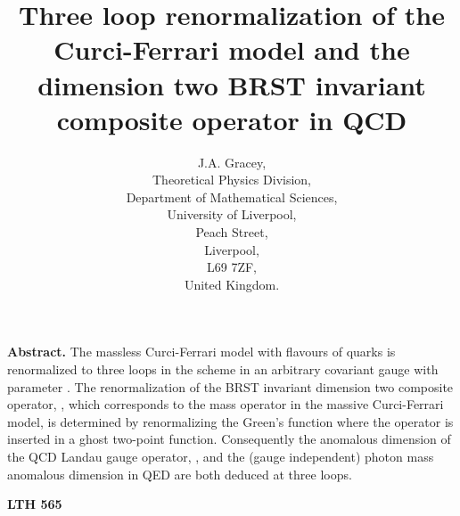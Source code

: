 \documentclass[a4paper,11pt]{article}
\providecommand{\half}{\mbox{\small{\myHighlight{$\frac{1}{2}$}\coordHE{}}}}
\providecommand{\Nf}{N_{\!f}}
\providecommand{\MSbar}{\overline{\mbox{MS}}}
\begin{document}
\title{Three loop \myHighlight{$\MSbar$}\coordHE{} renormalization of the Curci-Ferrari model and the 
dimension two BRST invariant composite operator in QCD} 
\author{J.A. Gracey, \\ Theoretical Physics Division, \\ 
Department of Mathematical Sciences, \\ University of Liverpool, \\ Peach 
Street, \\ Liverpool, \\ L69 7ZF, \\ United Kingdom.} 
\date{} 
\maketitle 
\vspace{5cm} 
\noindent 
{\bf Abstract.} The massless Curci-Ferrari model with \myHighlight{$\Nf$}\coordHE{} flavours of quarks 
is renormalized to three loops in the \myHighlight{$\MSbar$}\coordHE{} scheme in an arbitrary covariant
gauge with parameter \myHighlight{$\alpha$}\coordHE{}. The renormalization of the BRST invariant 
dimension two composite operator, \myHighlight{$\half A^{a\,2}_\mu$}\coordHE{}  \myHighlight{$-$}\coordHE{}  \coordHE{}, which corresponds to the mass operator in the massive Curci-Ferrari 
model, is determined by renormalizing the Green's function where the operator 
is inserted in a ghost two-point function. Consequently the anomalous dimension
of the QCD Landau gauge operator, \myHighlight{$\half A^{a\,2}_\mu$}\coordHE{}, and the (gauge 
independent) photon mass anomalous dimension in QED are both deduced at three 
loops. 

\vspace{-17.5cm}
\hspace{13.5cm}
{\bf LTH 565}
\end{document}
